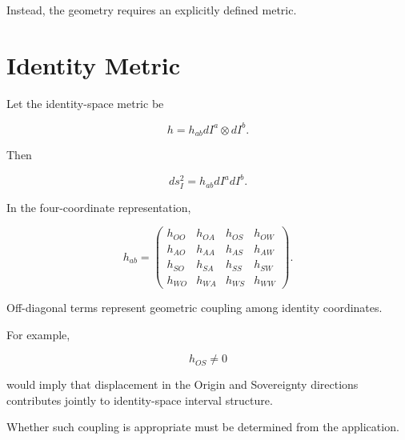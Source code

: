 \documentclass[12pt,oneside]{book}
\begin{document}
Instead, the geometry requires an explicitly defined metric.


\section{Identity Metric}
\label{sec:chapter-four-identity-metric}

Let the identity-space metric be

\begin{equation}
    h
    =
    h_{ab}
    dI^a
    \otimes
    dI^b.
    \label{eq:chapter-four-metric}
\end{equation}

Then

\begin{equation}
    ds_I^2
    =
    h_{ab}
    dI^a dI^b.
    \label{eq:sefi-line-element}
\end{equation}

In the four-coordinate representation,

\begin{equation}
    h_{ab}
    =
    \begin{pmatrix}
        h_{OO} & h_{OA} & h_{OS} & h_{OW} \\
        h_{AO} & h_{AA} & h_{AS} & h_{AW} \\
        h_{SO} & h_{SA} & h_{SS} & h_{SW} \\
        h_{WO} & h_{WA} & h_{WS} & h_{WW}
    \end{pmatrix}.
    \label{eq:identity-metric-matrix}
\end{equation}

Off-diagonal terms represent geometric coupling among identity
coordinates.

For example,

\begin{equation}
    h_{OS}
    \neq
    0
\end{equation}

would imply that displacement in the Origin and Sovereignty
directions contributes jointly to identity-space interval
structure.

Whether such coupling is appropriate must be determined from
the application.

\end{document}
